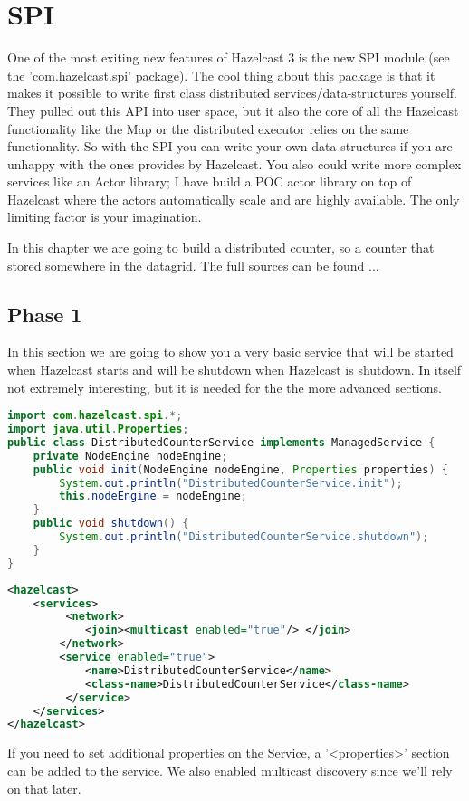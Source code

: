 \chapter{SPI}

One of the most exiting new features of Hazelcast 3 is the new SPI module (see the 'com.hazelcast.spi' package). The cool thing about this package is that it makes it possible to write first class distributed services/data-structures yourself. They pulled out this API into user space, but it also the core of all the Hazelcast functionality like the Map or the distributed executor relies on the same functionality. So with the SPI you can write your own data-structures if you are unhappy with the ones provides by Hazelcast. You also could write more complex services like an Actor library; I have build a POC actor library on top of Hazelcast where the actors automatically scale and are highly available. The only limiting factor is your imagination.

In this chapter we are going to build a distributed counter, so a counter that stored somewhere in the datagrid. The full sources can be found ...

\section{Phase 1}
In this section we are going to show you a very basic service that will be started when Hazelcast starts and will be shutdown when Hazelcast is shutdown. In itself not extremely interesting, but it is needed for the the more advanced sections.

\begin{lstlisting}[language=java]
import com.hazelcast.spi.*;
import java.util.Properties;
public class DistributedCounterService implements ManagedService {
    private NodeEngine nodeEngine;
    public void init(NodeEngine nodeEngine, Properties properties) {
        System.out.println("DistributedCounterService.init");
        this.nodeEngine = nodeEngine;
    }
    public void shutdown() {
        System.out.println("DistributedCounterService.shutdown");
    }
}
\end{lstlisting}

\begin{lstlisting}[language=xml]
<hazelcast>
    <services>
         <network>
            <join><multicast enabled="true"/> </join>
        </network>
        <service enabled="true">
            <name>DistributedCounterService</name>
            <class-name>DistributedCounterService</class-name>
         </service>
    </services>
</hazelcast>
\end{lstlisting}
If you need to set additional properties on the Service, a '<properties>' section can be added to the service. We also enabled multicast discovery since we'll rely on that later.


